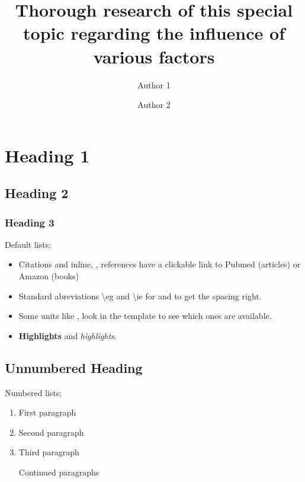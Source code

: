 \documentclass[pagesize,english,DIV=calc,footinclude=false
    ,DIV=14,twocolumn,fontsize=9pt
]{scrartcl}
\title{Thorough research of this special topic regarding the influence of
various factors}
\author{Author 1 \and Author 2}
\begin{document}
\maketitle


{
\hypersetup{linkcolor=black}
\setcounter{tocdepth}{2}
\tableofcontents
}

\section{Heading 1}\label{heading-1}

\subsection{Heading 2}\label{heading-2}

\subsubsection{Heading 3}\label{heading-3}

Default lists:

\begin{itemize}
\itemsep1pt\parskip0pt
\item
  Citations \autocite{Macherey2006} and inline,
  \eg \textcite{Macherey2006}, references have a clickable link to
  Pubmed (articles) or Amazon (books)
\item
  Standard abreviations \textbackslash{}eg and \textbackslash{}ie for
  \eg and \ie to get the spacing right.
\item
  Some units like , look in the template to see which ones are
  available.
\item
  \textbf{Highlights} and \emph{highlights}.
\end{itemize}

\subsection*{Unnumbered Heading}\label{unnumbered-heading}

Numbered lists:

\begin{enumerate}
\def\labelenumi{\arabic{enumi}.}
\item
  First paragraph
\item
  Second paragraph
\item
  Third paragraph

  Continued paragraphs
\end{enumerate}
\end{document}
